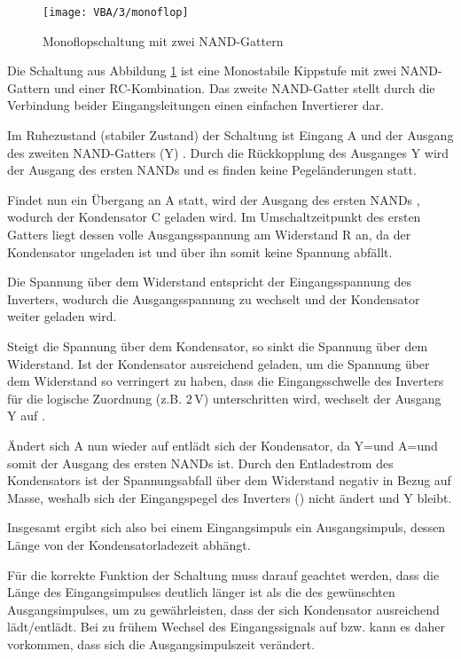 \begin{figure}[h]
  \begin{center}
    \texttt{[image: VBA/3/monoflop]}
  \end{center}
  \caption{Monoflopschaltung mit zwei NAND-Gattern}
  \label{fig:monoflop2}
\end{figure}

Die Schaltung aus Abbildung \ref{fig:monoflop2} ist eine Monostabile Kippstufe
mit zwei NAND-Gattern und einer RC-Kombination. Das zweite NAND-Gatter stellt
durch die Verbindung beider Eingangsleitungen einen einfachen Invertierer dar.

Im Ruhezustand (stabiler Zustand) der Schaltung ist Eingang A \HIGH und der
Ausgang des zweiten NAND-Gatters (Y) \HIGH. Durch die Rückkopplung des Ausganges Y wird der Ausgang des ersten
NANDs \LOW und es finden keine Pegeländerungen statt.

Findet nun ein \HIGH \to \LOW Übergang an A statt, wird der Ausgang des ersten
NANDs \HIGH, wodurch der Kondensator C geladen wird. Im Umschaltzeitpunkt des
ersten Gatters liegt dessen volle Ausgangsspannung am Widerstand R an, da der
Kondensator ungeladen ist und über ihn somit keine Spannung abfällt.

Die Spannung über dem Widerstand entspricht der Eingangsspannung des Inverters,
wodurch die Ausgangsspannung zu \LOW wechselt und der Kondensator weiter geladen wird.

Steigt die Spannung über dem Kondensator, so sinkt die Spannung über dem
Widerstand. Ist der Kondensator ausreichend geladen, um die Spannung über dem
Widerstand so verringert zu haben, dass die Eingangsschwelle des Inverters für
die logische Zuordnung (z.B. $2\,\si{\volt}$) unterschritten wird, wechselt der
Ausgang Y auf \HIGH. 

Ändert sich A nun wieder auf \HIGH entlädt sich der Kondensator, da Y=\HIGH und
A=\HIGH und somit der Ausgang des ersten NANDs \LOW ist. Durch den Entladestrom
des Kondensators ist der Spannungsabfall über dem Widerstand negativ in Bezug
auf Masse, weshalb sich der Eingangspegel des Inverters (\LOW) nicht ändert und
Y \HIGH bleibt.

Insgesamt ergibt sich also bei einem Eingangsimpuls ein Ausgangsimpuls, dessen Länge von der
Kondensatorladezeit abhängt.

Für die korrekte Funktion der Schaltung muss darauf geachtet werden, dass die
Länge des Eingangsimpulses deutlich länger ist als die des gewünschten
Ausgangsimpulses, um zu gewährleisten, dass der sich Kondensator ausreichend lädt/entlädt.
Bei zu frühem Wechsel des Eingangssignals auf \LOW bzw. \HIGH kann es daher
vorkommen, dass sich die Ausgangsimpulszeit verändert.

